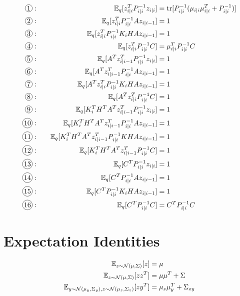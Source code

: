 \documentclass[12pt]{article}
\newcommand*\circled[1]{\tikz[baseline=(char.base)]{
    \node[shape=circle,draw,inner sep=0.8pt] (char) {#1};}}
\begin{document}
{\allowdisplaybreaks
\begin{align}
    {\circled{1}:} \quad && \E_q[z_{i|i}^TP^{-1}_{i|i}z_{i|i}] &= \tr [P^{-1}_{i|i}(\mu_{i|i}\mu_{i|i}^T + P^{-1}_{i|i})]\\
    {\circled{2}:} \quad && \E_q[z_{i|i}^TP^{-1}_{i|i}Az_{i|i-1}] &= 1\\
    {\circled{3}:} \quad && \E_q[z_{i|i}^TP^{-1}_{i|i}K_iHAz_{i|i-1}] &= 1\\
    {\circled{4}:} \quad && \E_q[z_{i|i}^TP^{-1}_{i|i}C] &= \mu_{i|i}^TP^{-1}_{i|i}C\\
    {\circled{5}:} \quad && \E_q[A^Tz^T_{i|i-1}P^{-1}_{i|i}z_{i|i}] &= 1\\
    {\circled{6}:} \quad && \E_q[A^Tz^T_{i|i-1}P^{-1}_{i|i}Az_{i|i-1}] &= 1\\
    {\circled{7}:} \quad && \E_q[A^Tz^T_{i|i}P^{-1}_{i|i}K_iHAz_{i|i-1}] &= 1\\
    {\circled{8}:} \quad && \E_q[A^Tz^T_{i|i}P^{-1}_{i|i}C] &= 1\\ 
    {\circled{9}:} \quad && \E_q[K_i^TH^TA^Tz^T_{i|i-1}P^{-1}_{i|i}z_{i|i}] &= 1\\
    {\circled{10}:} \quad && \E_q[K_i^TH^TA^Tz^T_{i|i-1}P^{-1}_{i|i}Az_{i|i-1}] &= 1\\
    {\circled{11}:} \quad && \E_q[K_i^TH^TA^Tz^T_{i|i-1}P^{-1}_{i|i}KHAz_{i|i-1}] &= 1\\
    {\circled{12}:} \quad && \E_q[K_i^TH^TA^Tz^T_{i|i-1}P^{-1}_{i|i}C] &= 1\\
    {\circled{13}:} \quad && \E_q[C^TP^{-1}_{i|i}z_{i|i}] &= 1\\ 
    {\circled{14}:} \quad && \E_q[C^TP^{-1}_{i|i}Az_{i|i-1}] &= 1\\
    {\circled{15}:} \quad && \E_q[C^TP^{-1}_{i|i}K_iHAz_{i|i-1}] &= 1 \\
    {\circled{16}:} \quad && \E_q[C^TP^{-1}_{i|i}C] &= C^TP^{-1}_{i|i}C
\end{align}
}

\appendix
\section{Expectation Identities} \label{sec:expectation_identities}
\begin{align}
    \mathbb{E}_{z \sim \mathcal{N}(\mu, \Sigma)} [z] &= \mu \\
    \mathbb{E}_{z \sim \mathcal{N}(\mu, \Sigma)} [zz^T] &= \mu\mu^T + \Sigma \\
    \mathbb{E}_{y \sim \mathcal{N}(\mu_y, \Sigma_y), z \sim \mathcal{N}(\mu_z, \Sigma_z)} [zy^T] &= \mu_z \mu_y^T + \Sigma_{zy}
\end{align}
\end{document}
